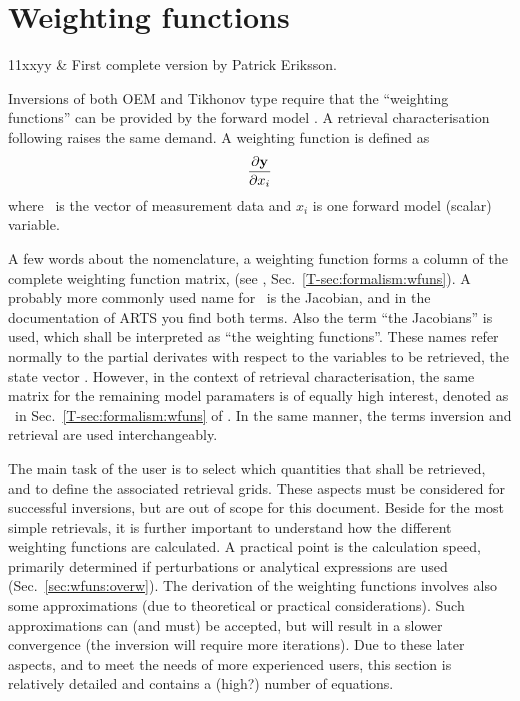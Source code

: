 \chapter{Weighting functions}
 \label{sec:wfuns}

 \starthistory
 11xxyy & First complete version by Patrick Eriksson.\\
 \stophistory

\graphicspath{{Figs/wfuns/}}


Inversions of both OEM and Tikhonov type require that the ``weighting
functions'' can be provided by the forward model \citep[see
e.g.][]{eriksson:analy:00}. A retrieval characterisation following
\citet{rodgers:90} raises the same demand. A weighting function is defined as 
\begin{equation}
  \frac{\partial \mathbf{y}}{\partial x_i}
  \label{eq:wfuns:ki}
\end{equation}
where \MsrVct\ is the vector of measurement data and $x_i$ is one forward model
(scalar) variable. 

A few words about the nomenclature, a weighting function forms a column of the
complete weighting function matrix, \aWfnMtr (see \theory,
Sec.~\ref{T-sec:formalism:wfuns}). A probably more commonly used name for
\aWfnMtr\ is the Jacobian, and in the documentation of ARTS you find both
terms. Also the term ``the Jacobians'' is used, which shall be interpreted as
``the weighting functions''. These names refer normally to the partial
derivates with respect to the variables to be retrieved, the state vector
\SttVct. However, in the context of retrieval characterisation, the same matrix
for the remaining model paramaters is of equally high interest, denoted as
\aWfnMtr{\FrwMdlVct}\ in Sec.~\ref{T-sec:formalism:wfuns} of \theory. In the
same manner, the terms inversion and retrieval are used interchangeably.

The main task of the user is to select which quantities that shall be
retrieved, and to define the associated retrieval grids. These aspects must be
considered for successful inversions, but are out of scope for this document.
Beside for the most simple retrievals, it is further important to understand
how the different weighting functions are calculated. A practical point is the
calculation speed, primarily determined if perturbations or analytical
expressions are used (Sec.~\ref{sec:wfuns:overw}). The derivation of the
weighting functions involves also some approximations (due to theoretical or
practical considerations). Such approximations can (and must) be accepted, but
will result in a slower convergence (the inversion will require more
iterations). Due to these later aspects, and to meet the needs of more
experienced users, this section is relatively detailed and contains a (high?)
number of equations.



